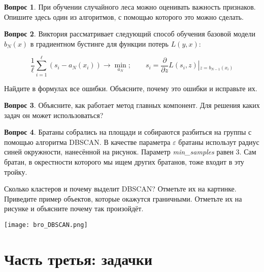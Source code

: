 \documentclass[12pt]{article}
\theoremstyle{definition}
\newtheorem{question}{Вопрос}
\begin{document}
\vspace{5cm} 


\begin{question}
При обучении случайного леса можно оценивать важность признаков. Опишите здесь один из алгоритмов, с помощью которого это можно сделать.
\end{question}

\newpage


\begin{question}
Виктория рассматривает следующий способ обучения базовой модели $b_N(x)$ в градиентном бустинге для функции потерь $L(y, x)$: 

\[
\frac{1}{\ell} \sum_{i = 1}^{\ell} (s_i - a_N(x_i)) \to \min_{a_N}; \qquad s_i = \frac{\partial}{\partial z} L(s_i, z) \left|_{z = b_{N-1}(x_i)} \right.
\]

Найдите в формулах все ошибки. Объясните, почему это ошибки и исправьте их. 
\end{question}


\vspace{7cm} 

\begin{question}
Объясните, как работает метод главных компонент. Для решения каких задач он может использоваться? 
\end{question}

\newpage 

\begin{question}
Братаны собрались на площади и собираются разбиться на группы с помощью алгоритма DBSCAN. В качестве параметра $\varepsilon$ братаны использут радиус синей окружности, нанесённой на рисунок. Параметр \textit{min\_samples} равен $3$. Сам братан, в окрестности которого мы ищем других братанов, тоже входит в эту тройку. 

Сколько кластеров и почему выделит DBSCAN? Отметьте их на картинке. Приведите пример объектов, которые окажутся граничными. Отметьте их на рисунке и объясните почему так произойдёт. 

    \begin{center}
        \texttt{[image: bro\_DBSCAN.png]}
    \end{center}
\end{question}


\newpage 


\section*{Часть третья: задачки}
\end{document}
